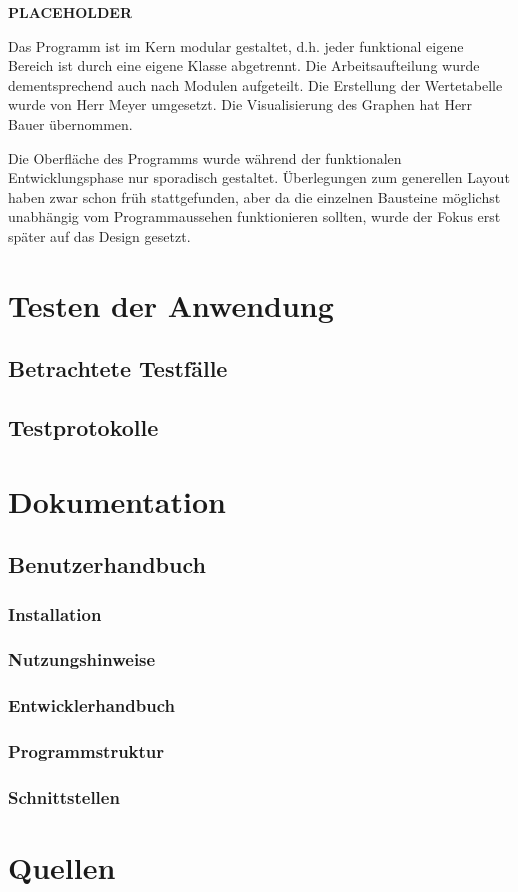 \documentclass{article}
\begin{document}
    \textbf{PLACEHOLDER}%

    Das Programm ist im Kern modular gestaltet, d.h. jeder funktional eigene Bereich ist durch eine eigene Klasse abgetrennt.
    Die Arbeitsaufteilung wurde dementsprechend auch nach Modulen aufgeteilt.
    Die Erstellung der Wertetabelle wurde von Herr Meyer umgesetzt.
    Die Visualisierung des Graphen hat Herr Bauer übernommen.

    Die Oberfläche des Programms wurde während der funktionalen Entwicklungsphase nur sporadisch gestaltet.
    Überlegungen zum generellen Layout haben zwar schon früh stattgefunden, aber da die einzelnen Bausteine möglichst unabhängig vom Programmaussehen funktionieren sollten, wurde der Fokus erst später auf das Design gesetzt.

\newpage
\section{Testen der Anwendung}

\subsection{Betrachtete Testfälle}


\subsection{Testprotokolle}


\newpage
\section{Dokumentation}

\subsection{Benutzerhandbuch}
    \subsubsection{Installation}

    \subsubsection{Nutzungshinweise}

\subsubsection{Entwicklerhandbuch}
    \subsubsection{Programmstruktur}

    \subsubsection{Schnittstellen}

\newpage
\section{Quellen}


\end{document}
